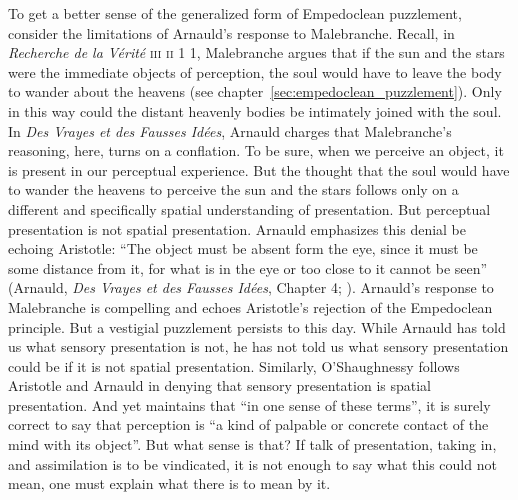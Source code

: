 To get a better sense of the generalized form of Empedoclean puzzlement, consider the limitations of Arnauld's response to Malebranche. Recall, in \emph{Recherche de la V\'{e}rit\'{e}} \textsc{iii} \textsc{ii} 1 1, Malebranche argues that if the sun and the stars were the immediate objects of perception, the soul would have to leave the body to wander about the heavens (see chapter~\ref{sec:empedoclean_puzzlement}). Only in this way could the distant heavenly bodies be intimately joined with the soul. In \emph{Des Vrayes et des Fausses Id\'{e}es}, Arnauld charges that Malebranche's reasoning, here, turns on a conflation. To be sure, when we perceive an object, it is present in our perceptual experience. But the thought that the soul would have to wander the heavens to perceive the sun and the stars follows only on a different and specifically spatial understanding of presentation. But perceptual presentation is not spatial presentation. Arnauld emphasizes this denial be echoing Aristotle: ``The object must be absent form the eye, since it must be some distance from it, for what is in the eye or too close to it cannot be seen'' (Arnauld, \emph{Des Vrayes et des Fausses Id\'{e}es}, Chapter 4; \citealt[62]{Gaukroger:1990rz}). Arnauld's response to Malebranche is compelling and echoes Aristotle's rejection of the Empedoclean principle. But a vestigial puzzlement persists to this day. While Arnauld has told us what sensory presentation is not, he has not told us what sensory presentation could be if it is not spatial presentation. Similarly, O'Shaughnessy follows Aristotle and Arnauld in denying that sensory presentation is spatial presentation. And yet \citet[183]{OShaughnessy:2003eu} maintains that ``in one sense of these terms'', it is surely correct to say that perception is ``a kind of palpable or concrete contact of the mind with its object''. But what sense is that? If talk of presentation, taking in, and assimilation is to be vindicated, it is not enough to say what this could not mean, one must explain what there is to mean by it.

